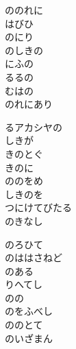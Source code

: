 \documentclass[10pt,b5j]{tarticle} %
\begin{document}
\begin{enumerate}
\begin{minipage}[c]{\blocksize}
        \vspace{\linespace}
        \item
        ののれに\\
        はびひ\\
        のにり\\
        のしきの\\
        にふの\\
        るるの\\
        むはの\\
        のれにあり
        
        \vspace{\linespace}
        \item
        るアカシヤの\\
        しきが\\
        きのとぐ\\
        きのに\\
        ののをめ\\
        しきのを\\
        つにけてびたる\\
        のきなし
        
        \vspace{\linespace}
        \item
        のろひて\\
        のははさねど\\
        のある\\
        りへてし\\
        のの\\
        のをふべし\\
        ののとて\\
        のいざまん
    
    \end{minipage}
\end{enumerate} %
\end{document}
